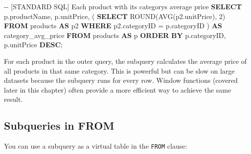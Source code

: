 \documentclass[
  letterpaper,
  DIV=11,
  numbers=noendperiod]{scrreprt}
\newenvironment{Shaded}{\begin{snugshade}}{\end{snugshade}}
\newcommand{\CommentTok}[1]{\textcolor[rgb]{0.37,0.37,0.37}{#1}}
\newcommand{\DecValTok}[1]{\textcolor[rgb]{0.68,0.00,0.00}{#1}}
\newcommand{\FunctionTok}[1]{\textcolor[rgb]{0.28,0.35,0.67}{#1}}
\newcommand{\KeywordTok}[1]{\textcolor[rgb]{0.00,0.23,0.31}{\textbf{#1}}}
\newcommand{\NormalTok}[1]{\textcolor[rgb]{0.00,0.23,0.31}{#1}}
\newcommand{\OperatorTok}[1]{\textcolor[rgb]{0.37,0.37,0.37}{#1}}
\begin{document}
\begin{codelisting}

\caption{\texttt{duckdb}}

\begin{Shaded}
\begin{Highlighting}[]
\CommentTok{{-}{-} [STANDARD SQL] Each product with its category\textquotesingle{}s average price}
\KeywordTok{SELECT}
\NormalTok{    p.productName,}
\NormalTok{    p.unitPrice,}
\NormalTok{    (}
        \KeywordTok{SELECT} \FunctionTok{ROUND}\NormalTok{(}\FunctionTok{AVG}\NormalTok{(p2.unitPrice), }\DecValTok{2}\NormalTok{)}
        \KeywordTok{FROM}\NormalTok{ products }\KeywordTok{AS}\NormalTok{ p2}
        \KeywordTok{WHERE}\NormalTok{ p2.categoryID }\OperatorTok{=}\NormalTok{ p.categoryID}
\NormalTok{    ) }\KeywordTok{AS}\NormalTok{ category\_avg\_price}
\KeywordTok{FROM}\NormalTok{ products }\KeywordTok{AS}\NormalTok{ p}
\KeywordTok{ORDER} \KeywordTok{BY}\NormalTok{ p.categoryID, p.unitPrice }\KeywordTok{DESC}\NormalTok{;}
\end{Highlighting}
\end{Shaded}

\end{codelisting}

For each product in the outer query, the subquery calculates the average
price of all products in that same category. This is powerful but can be
slow on large datasets because the subquery runs for every row. Window
functions (covered later in this chapter) often provide a more efficient
way to achieve the same result.

\subsection{Subqueries in FROM}\label{subqueries-in-from}

You can use a subquery as a virtual table in the \texttt{FROM} clause:
\end{document}
